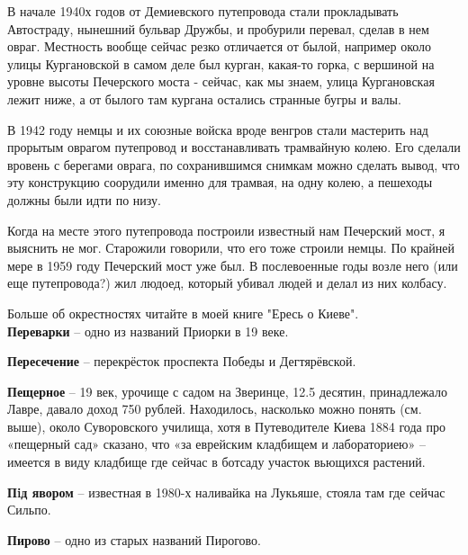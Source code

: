 В начале 1940х годов от Демиевского путепровода стали прокладывать Автостраду, нынешний бульвар Дружбы, и пробурили перевал, сделав в нем овраг. Местность вообще сейчас резко отличается от былой, например около улицы Кургановской в самом деле был курган, какая-то горка, с вершиной на уровне высоты Печерского моста - сейчас, как мы знаем, улица Кургановская лежит ниже, а от былого там кургана остались странные бугры и валы. 

В 1942 году немцы и их союзные войска вроде венгров стали мастерить над прорытым оврагом путепровод и восстанавливать трамвайную колею. Его сделали вровень с берегами оврага, по сохранившимся снимкам можно сделать вывод, что эту конструкцию соорудили именно для трамвая, на одну колею, а пешеходы должны были идти по низу.

Когда на месте этого путепровода построили известный нам Печерский мост, я выяснить не мог. Старожили говорили, что его тоже строили немцы. По крайней мере в 1959 году Печерский мост уже был. В послевоенные годы возле него (или еще путепровода?) жил людоед, который убивал людей и делал из них колбасу.

Больше об окрестностях читайте в моей книге "Ересь о Киеве".\\

\textbf{Переварки} – одно из названий Приорки в 19 веке.\\

\medskip

\textbf{Пересечение} – перекрёсток проспекта Победы и Дегтярёвской.\\

\medskip



\textbf{Пещерное} – 19 век, урочище с садом на Зверинце, 12.5 десятин, принадлежало Лавре, давало доход 750 рублей. Находилось, насколько можно понять (см. выше), около Суворовского училища, хотя в Путеводителе Киева 1884 года про «пещерный сад» сказано, что «за еврейским кладбищем и лабораториею» – имеется в виду кладбище где сейчас в ботсаду участок вьющихся растений.\\

\medskip

\textbf{Пiд явором} – известная в 1980-х наливайка на Лукьяше, стояла там где сейчас Сильпо.\\


\medskip

\textbf{Пирово} – одно из старых названий Пирогово.\\


